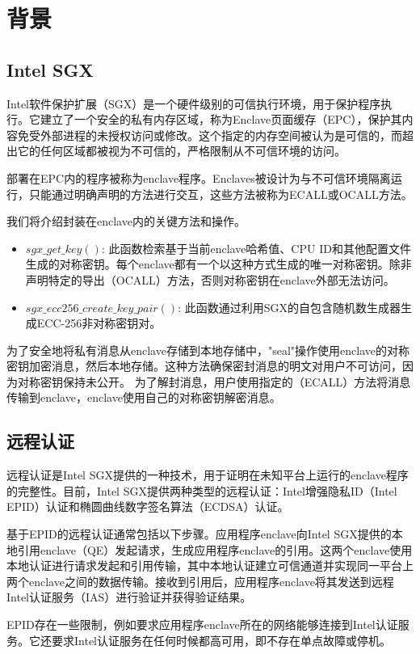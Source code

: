 \section{背景}
\subsection{Intel SGX}
Intel软件保护扩展（SGX）是一个硬件级别的可信执行环境，用于保护程序执行。它建立了一个安全的私有内存区域，称为Enclave页面缓存（EPC），保护其内容免受外部进程的未授权访问或修改。这个指定的内存空间被认为是可信的，而超出它的任何区域都被视为不可信的，严格限制从不可信环境的访问。

部署在EPC内的程序被称为enclave程序。Enclaves被设计为与不可信环境隔离运行，只能通过明确声明的方法进行交互，这些方法被称为ECALL或OCALL方法。

我们将介绍封装在enclave内的关键方法和操作。
\begin{itemize}
\item $sgx\_get\_key()$: 此函数检索基于当前enclave哈希值、CPU ID和其他配置文件生成的对称密钥。每个enclave都有一个以这种方式生成的唯一对称密钥。除非声明特定的导出（OCALL）方法，否则对称密钥在enclave外部无法访问。
\item $sgx\_ecc256\_create\_key\_pair()$: 此函数通过利用SGX的自包含随机数生成器生成ECC-256非对称密钥对。
\end{itemize}

为了安全地将私有消息从enclave存储到本地存储中，"seal"操作使用enclave的对称密钥加密消息，然后本地存储。这种方法确保密封消息的明文对用户不可访问，因为对称密钥保持未公开。
为了解封消息，用户使用指定的（ECALL）方法将消息传输到enclave，enclave使用自己的对称密钥解密消息。

\subsection{远程认证}
远程认证是Intel SGX提供的一种技术，用于证明在未知平台上运行的enclave程序的完整性。目前，Intel SGX提供两种类型的远程认证：Intel增强隐私ID（Intel EPID）认证和椭圆曲线数字签名算法（ECDSA）认证。

基于EPID的远程认证通常包括以下步骤。应用程序enclave向Intel SGX提供的本地引用enclave（QE）发起请求，生成应用程序enclave的引用。这两个enclave使用本地认证进行请求发起和引用传输，其中本地认证建立可信通道并实现同一平台上两个enclave之间的数据传输。接收到引用后，应用程序enclave将其发送到远程Intel认证服务（IAS）进行验证并获得验证结果。

EPID存在一些限制，例如要求应用程序enclave所在的网络能够连接到Intel认证服务。它还要求Intel认证服务在任何时候都高可用，即不存在单点故障或停机。

